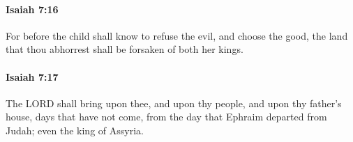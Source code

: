 		\paragraph{Isaiah 7:16} %
			\label{ISAIAH-7-16}

			For before the child shall know to refuse the evil, and choose the good, the land that thou abhorrest shall be forsaken of both her kings.


		\paragraph{Isaiah 7:17} %
			\label{ISAIAH-7-17}

			The LORD shall bring upon thee, and upon thy people, and upon thy father's house, days that have not come, from the day that Ephraim departed from Judah; even the king of Assyria.


